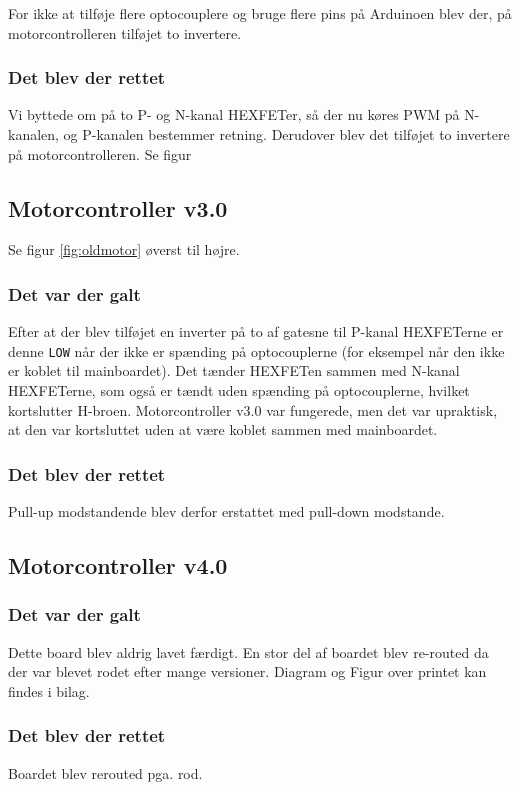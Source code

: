 \documentclass[a4paper,11pt,oneside,article,danish,table]{memoir}
\newcommand{\boarddate}[1]{\marginpar{\tiny\textcolor{blue!80!black}{#1}}}
\begin{document}
For ikke at tilføje flere optocouplere og bruge flere pins på Arduinoen blev der, på motorcontrolleren tilføjet to invertere.
\subsubsection{Det blev der rettet}
Vi byttede om på to P- og N-kanal HEXFETer, så der nu køres PWM på N-kanalen, og P-kanalen bestemmer retning. Derudover blev det tilføjet to invertere på motorcontrolleren. Se figur 

\subsection{Motorcontroller v3.0}
\boarddate{27. marts 2012}
Se figur \ref{fig:oldmotor} øverst til højre.
\subsubsection{Det var der galt} 
Efter at der blev tilføjet en inverter på to af gatesne til P-kanal HEXFETerne er denne \lstinline{LOW} når der ikke er spænding på optocouplerne (for eksempel når den ikke er koblet til mainboardet). Det tænder HEXFETen sammen med N-kanal HEXFETerne, som også er tændt uden spænding på optocouplerne, hvilket kortslutter H-broen. Motorcontroller v3.0 var fungerede, men det var upraktisk, at den var kortsluttet uden at være koblet sammen med mainboardet.

\subsubsection{Det blev der rettet}
Pull-up modstandende blev derfor erstattet med pull-down modstande.
\subsection{Motorcontroller v4.0}
\boarddate{12. april 2012} 
\subsubsection{Det var der galt} 
Dette board blev aldrig lavet færdigt. 
En stor del af boardet blev re-routed da der var blevet rodet efter mange versioner. Diagram og Figur over printet kan findes i bilag. 
\subsubsection{Det blev der rettet}
Boardet blev rerouted pga. rod.
\end{document}
